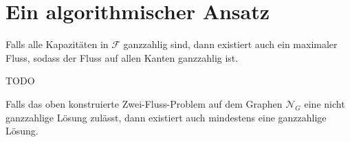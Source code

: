 \chapter{Ein algorithmischer Ansatz}


\begin{theorem}\label{ift}

Falls alle Kapazitäten in $\mathcal{F}$ ganzzahlig sind, dann existiert auch ein maximaler Fluss, sodass der Fluss auf allen Kanten ganzzahlig ist.

\end{theorem}

\begin{theorem}\label{mfmc}

TODO

\end{theorem}

\begin{theorem}

Falls das oben konstruierte Zwei-Fluss-Problem auf dem Graphen $\mathcal{N}_G$ eine nicht ganzzahlige Lösung zulässt, dann existiert auch mindestens eine ganzzahlige Lösung.

\end{theorem}


